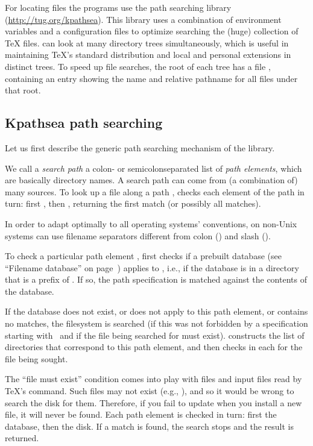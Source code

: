\documentclass{article}
\begin{document}
For locating files the \Webc{} programs use the path searching library
\KPS{} (\url{http://tug.org/kpathsea}).  This library uses a combination
of environment variables and a configuration files to optimize searching
the (huge) collection of \TeX{} files.  \Webc{} can look at many
directory trees simultaneously, which is useful in maintaining \TeX's
standard distribution and local and personal extensions in distinct
trees.  To speed up file searches, the root of each tree has a file
, containing an entry showing the name and relative pathname
for all files under that root.


\subsection{Kpathsea path searching}
\label{sec:kpathsea}

Let us first describe the generic path searching mechanism of the \KPS{}
library.

We call a \emph{search path} a colon- or semicolon\hyph sepa\-rated list
of \emph{path elements}, which are basically directory names.  A
search path can come from (a combination of) many sources.  To look up
a file  along a path , \KPS{} checks each
element of the path in turn: first , then
, returning the first match (or possibly all
matches).

In order to adapt optimally to all operating systems' conventions, on
non-Unix systems \KPS{} can use filename separators different from
colon (\samp{:}) and slash (\samp{/}).

To check a particular path element , \KPS{} first checks if a
prebuilt database (see ``Filename data\-base'' on
page~\pageref{sec:filename-database}) applies to , i.e., if the
database is in a directory that is a prefix of .  If so, the path
specification is matched against the contents of the database.

If the database does not exist, or does not apply to this path
element, or contains no matches, the filesystem is searched (if this
was not forbidden by a specification starting with \samp{!!}\ and if
the file being searched for must exist).  \KPS{} constructs the list
of directories that correspond to this path element, and then checks
in each for the file being sought.

The ``file must exist'' condition comes into play with  files and
input files read by \TeX's  command.  Such files may not
exist (e.g., ), and so it would be wrong to search the
disk for them.  Therefore, if you fail to update  when you
install a new  file, it will never be found.
Each path element is checked in turn: first the database, then the
disk.  If a match is found, the search stops and the result is
returned.
\end{document}
